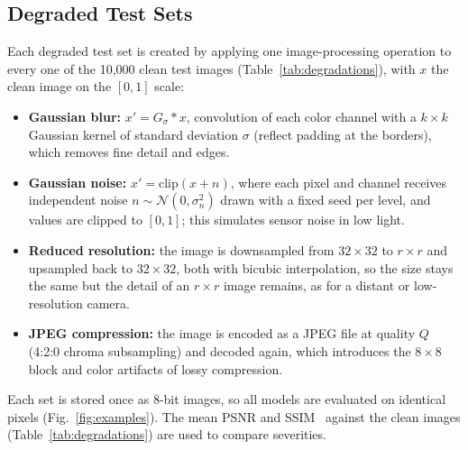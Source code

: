 \documentclass[conference]{IEEEtran}
\begin{document}
\subsection{Degraded Test Sets}
Each degraded test set is created by applying one image-processing operation to every one of the 10{,}000 clean test images (Table~\ref{tab:degradations}), with $x$ the clean image on the $[0,1]$ scale:
\begin{itemize}
\item \textbf{Gaussian blur:} $x' = G_\sigma * x$, convolution of each color channel with a $k\times k$ Gaussian kernel of standard deviation $\sigma$ (reflect padding at the borders), which removes fine detail and edges.
\item \textbf{Gaussian noise:} $x' = \mathrm{clip}(x + n)$, where each pixel and channel receives independent noise $n \sim \mathcal{N}(0, \sigma_n^2)$ drawn with a fixed seed per level, and values are clipped to $[0,1]$; this simulates sensor noise in low light.
\item \textbf{Reduced resolution:} the image is downsampled from $32\times32$ to $r\times r$ and upsampled back to $32\times32$, both with bicubic interpolation, so the size stays the same but the detail of an $r\times r$ image remains, as for a distant or low-resolution camera.
\item \textbf{JPEG compression:} the image is encoded as a JPEG file at quality $Q$ (4:2:0 chroma subsampling) and decoded again, which introduces the $8\times8$ block and color artifacts of lossy compression.
\end{itemize}
Each set is stored once as 8-bit images, so all models are evaluated on identical pixels (Fig.~\ref{fig:examples}). The mean PSNR and SSIM~\cite{wang2004} against the clean images (Table~\ref{tab:degradations}) are used to compare severities.
\end{document}
